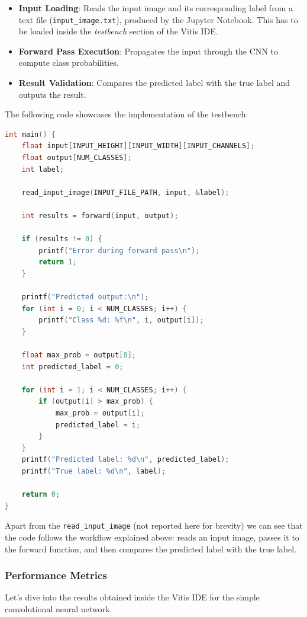 \documentclass{article}
\begin{document}
\begin{itemize}
    \item \textbf{Input Loading}: Reads the input image and its corresponding label from a text file (\texttt{input\_image.txt}), produced by the Jupyter Notebook. This has to be loaded inside the \textit{testbench} section of the Vitis IDE.
    \item \textbf{Forward Pass Execution}: Propagates the input through the CNN to compute class probabilities.
    \item \textbf{Result Validation}: Compares the predicted label with the true label and outputs the result.
\end{itemize}

The following code showcases the implementation of the testbench:

\begin{lstlisting}[language=C]
int main() {
    float input[INPUT_HEIGHT][INPUT_WIDTH][INPUT_CHANNELS];
    float output[NUM_CLASSES];
    int label;

    read_input_image(INPUT_FILE_PATH, input, &label);

    int results = forward(input, output);

    if (results != 0) {
        printf("Error during forward pass\n");
        return 1;
    }

    printf("Predicted output:\n");
    for (int i = 0; i < NUM_CLASSES; i++) {
        printf("Class %d: %f\n", i, output[i]);
    }

    float max_prob = output[0];
    int predicted_label = 0;

    for (int i = 1; i < NUM_CLASSES; i++) {
        if (output[i] > max_prob) {
            max_prob = output[i];
            predicted_label = i;
        }
    }
    printf("Predicted label: %d\n", predicted_label);
    printf("True label: %d\n", label);

    return 0;
}
\end{lstlisting}

Apart from the \texttt{read\_input\_image} (not reported here for brevity) we can see that the code follows the workflow explained above: reads an input image, passes it to the forward function, and then compares the predicted label with the true label.

\subsubsection{Performance Metrics}
Let's dive into the results obtained inside the Vitis IDE for the simple convolutional neural network. 
\end{document}
